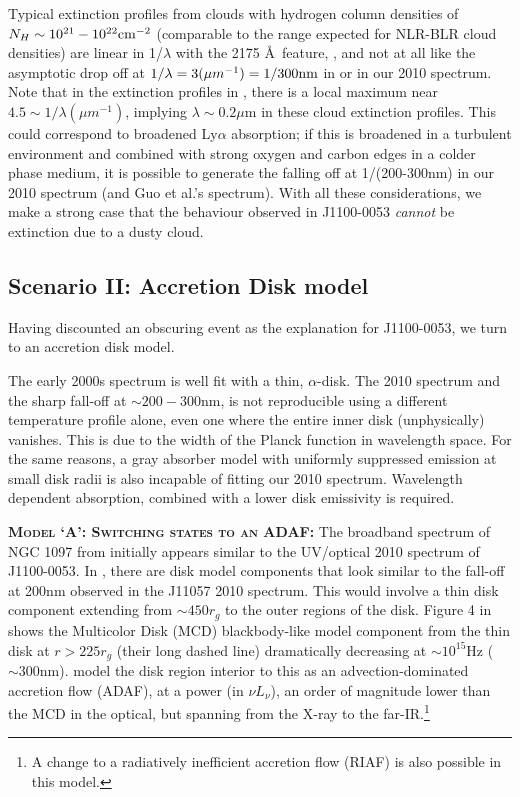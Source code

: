 \documentclass[11pt,a4paper]{article}
\begin{document}
Typical extinction profiles from clouds with hydrogen column densities
of $N_{H} \sim 10^{21}-10^{22} \rm{cm}^{-2}$ (comparable to the range
expected for NLR-BLR cloud densities) are linear in 
1/$\lambda$ with the 2175 \AA\ feature, \citep[e.g., Figure 4
of][]{Gordon2003}, and not at all like the asymptotic drop off at
$1/\lambda=3 (\mu m^{-1})=1/300\rm{nm}$ in \citet{Guo2016} or in our
2010 spectrum. Note that in the extinction profiles in
\citet{Gordon2003}, there is a local maximum near $4.5 \sim 1/\lambda (\mu
m^{-1})$, implying $\lambda \sim 0.2\mu$m in these
cloud extinction profiles. %
This could correspond to broadened Ly$\alpha$ absorption;
if this is broadened in a turbulent environment and combined with
strong oxygen and carbon edges in a colder phase medium, it is possible to
generate the falling off at 1/(200-300nm) in our 2010 spectrum (and
Guo et al.'s spectrum). With all these considerations, we make a strong case
that the behaviour observed in J1100-0053 \emph{cannot} be extinction due
to a dusty cloud.


\subsection*{Scenario II: Accretion Disk model}
Having discounted an obscuring event as the explanation for J1100-0053,
we turn to an accretion disk model.

The early 2000s spectrum is well fit with a thin, \citet{SS73} $\alpha$-disk. The 2010 spectrum and the sharp fall-off at $\sim 200-300$nm, is not reproducible using a different temperature profile alone, even one where the entire inner disk (unphysically) vanishes. This is due to the width of the Planck function in wavelength space. For the same reasons, a gray absorber model with uniformly suppressed emission at small disk radii is also incapable of fitting our 2010 \citep[or ][]{Guo2016} spectrum. Wavelength dependent absorption, combined with a lower disk emissivity is required. 

\smallskip \smallskip
\noindent
\textbf{\textsc{Model `A': Switching states to an ADAF: }}
The broadband spectrum of NGC 1097 from \citet{Nemmen2006} initially appears similar to the UV/optical 2010 spectrum of J1100-0053.  In \citet[][e.g., their Figure 4]{Nemmen2006}, there are disk model components that look similar to the fall-off at 200nm observed in the J11057 2010 spectrum. This would involve a thin disk component extending from $\sim 450r_{g}$ to the outer regions of the disk. Figure 4 in \citet{Nemmen2006} shows the Multicolor Disk (MCD) blackbody-like model component from the thin disk at $r>225r_{g}$ (their long dashed line) dramatically decreasing at $\sim 10^{15}$Hz ($\sim 300$nm). \citet{Nemmen2006} model the disk region interior to this as an advection-dominated accretion flow (ADAF), at a power (in $\nu L_{\nu}$), an order of magnitude lower than the MCD in the optical, but spanning from the X-ray to the far-IR.\footnote{A change to  a radiatively inefficient accretion flow (RIAF) is also possible in this model.}
\end{document}
